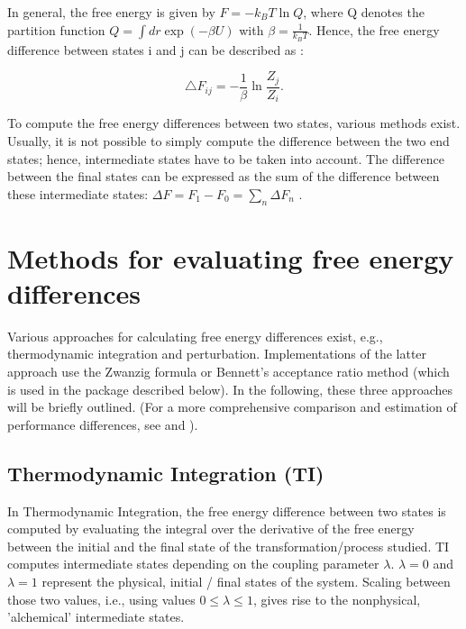 In general, the free energy is given by $F=-k_{B}T\ln Q$, where Q denotes the partition function $Q=\int dr\exp\left(-\beta U\right)$
with $\beta=\frac{1}{k_{B}T}$. Hence, the free energy difference between
states i and j can be described as \cite{Shirts.2013}:

\[
\bigtriangleup F_{ij}=-\frac{1}{\beta}\ln\frac{Z_{j}}{Z_{i}}.
\]

To compute the free energy differences between two states, various
methods exist. Usually, it is not possible to simply compute the difference
between the two end states; hence, intermediate states have to be taken
into account. The difference between the final states can be expressed
as the sum of the difference between these intermediate states: $\Delta F=F_{1}-F_{0}=\sum_{n}\Delta F_{n}$
\cite{Mey.2020}.

\section{Methods for evaluating free energy differences}

Various approaches for calculating free energy differences exist,
e.g., thermodynamic integration and perturbation. Implementations of the latter approach use
the Zwanzig formula or Bennett's acceptance ratio method (which is
used in the {\trafo} package described below). In the following,
these three approaches will be briefly outlined. (For a more
comprehensive comparison and estimation of performance differences,
see \cite{Bruckner.2011} and \cite{Ruiter.2013}).

\subsection{Thermodynamic Integration (TI)}

In Thermodynamic Integration, the free energy difference between two
states is computed by evaluating the integral over the derivative of the free energy
between the initial and the final state of the transformation/process studied. TI computes intermediate
states depending on the coupling parameter $\lambda$. $\lambda=0$
and $\lambda=1$ represent the physical, initial / final states of
the system. Scaling between those two values, i.e., using values $0\le\lambda\le1$,
gives rise to the nonphysical, 'alchemical' intermediate states.

